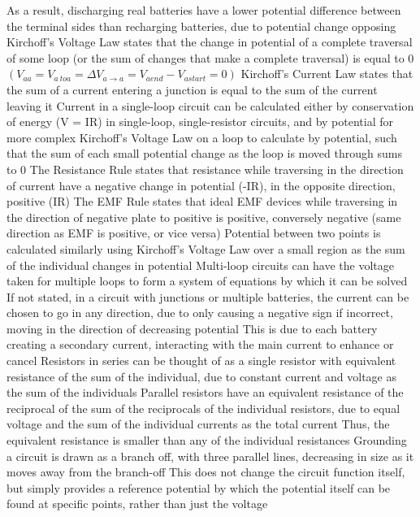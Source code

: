 \documentclass[11 pt, twoside]{article}
\newenvironment{outline*}
{
	\begin{outline}[enumerate]
	}
	{\end{outline}
}
\begin{document}
\begin{outline*}
\4 As a result, discharging real batteries have a lower potential difference between the terminal sides than recharging batteries, due to potential change opposing
\1 Kirchoff's Voltage Law states that the change in potential of a complete traversal of some loop (or the sum of changes that make a complete traversal) is equal to 0 $(V_{aa} = V_{a\ to a} = \Delta V_{a \to a} = V_{aend} - V_{astart} = 0)$
\2 Kirchoff's Current Law states that the sum of a current entering a junction is equal to the sum of the current leaving it
\1 Current in a single-loop circuit can be calculated either by conservation of energy (V = IR) in single-loop, single-resistor circuits, and by potential for more complex
\2 Kirchoff's Voltage Law on a loop to calculate by potential, such that the sum of each small potential change as the loop is moved through sums to 0
\3 The Resistance Rule states that resistance while traversing in the direction of current have a negative change in potential (-IR), in the opposite direction, positive (IR)
\3 The EMF Rule states that ideal EMF devices while traversing in the direction of negative plate to positive is positive, conversely negative (same direction as EMF is positive, or vice versa)
\2 Potential between two points is calculated similarly using Kirchoff's Voltage Law over a small region as the sum of the individual changes in potential
\2 Multi-loop circuits can have the voltage taken for multiple loops to form a system of equations by which it can be solved
\2 If not stated, in a circuit with junctions or multiple batteries, the current can be chosen to go in any direction, due to only causing a negative sign if incorrect, moving in the direction of decreasing potential
\3 This is due to each battery creating a secondary current, interacting with the main current to enhance or cancel
\1 Resistors in series can be thought of as a single resistor with equivalent resistance of the sum of the individual, due to constant current and voltage as the sum of the individuals
\2 Parallel resistors have an equivalent resistance of the reciprocal of the sum of the reciprocals of the individual resistors, due to equal voltage and the sum of the individual currents as the total current
\3 Thus, the equivalent resistance is smaller than any of the individual resistances
\1 Grounding a circuit is drawn as a branch off, with three parallel lines, decreasing in size as it moves away from the branch-off
\2 This does not change the circuit function itself, but simply provides a reference potential by which the potential itself can be found at specific points, rather than just the voltage

\end{outline*}
\end{document}
